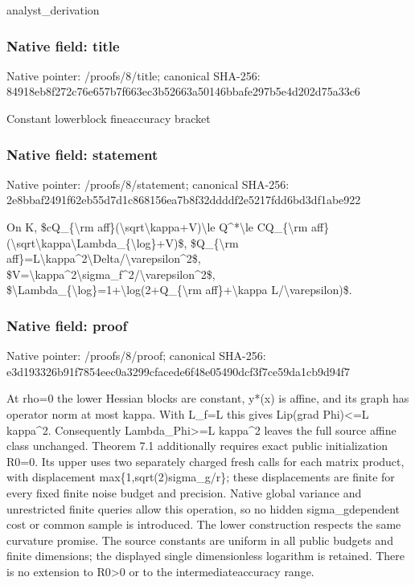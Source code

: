 \documentclass[10pt,a4paper]{article}
\begin{document}
analyst\_derivation


\subsubsection{Native field: title}


Native pointer: /proofs/8/title; canonical SHA-256: 84918eb8f272c76e657b7f66\allowbreak{}3ec3b52663a50146bbafe297\allowbreak{}b5e4d202d75a33c6


Constant lowerblock fineaccuracy bracket


\subsubsection{Native field: statement}


Native pointer: /proofs/8/statement; canonical SHA-256: 2e8bbaf2491f62eb55d7d1c8\allowbreak{}68156ea7b8f32ddddf2e5217\allowbreak{}fdd6bd3df1abe922


On K, \$cQ\_\{\textbackslash{}rm aff\}(\textbackslash{}sqrt\textbackslash{}kappa+V)\textbackslash{}le Q\textasciicircum{}*\textbackslash{}le CQ\_\{\textbackslash{}rm aff\}(\textbackslash{}sqrt\textbackslash{}kappa\textbackslash{}Lambda\_\{\textbackslash{}log\}+V)\$, \$Q\_\{\textbackslash{}rm aff\}=L\textbackslash{}kappa\textasciicircum{}2\textbackslash{}Delta/\textbackslash{}varepsilon\textasciicircum{}2\$, \$V=\textbackslash{}kappa\textasciicircum{}2\textbackslash{}sigma\_f\textasciicircum{}2/\textbackslash{}varepsilon\textasciicircum{}2\$, \$\textbackslash{}Lambda\_\{\textbackslash{}log\}=1+\textbackslash{}log(2+Q\_\{\textbackslash{}rm aff\}+\textbackslash{}kappa L/\textbackslash{}varepsilon)\$.


\subsubsection{Native field: proof}


Native pointer: /proofs/8/proof; canonical SHA-256: e3d193326b91f7854eec0a32\allowbreak{}99cfacede6f48e05490dcf3f\allowbreak{}7ce59da1cb9d94f7


At rho=0 the lower Hessian blocks are constant, y*(x) is affine, and its graph has operator norm at most kappa. With L\_f=L this gives Lip(grad Phi)<=L kappa\textasciicircum{}2. Consequently Lambda\_Phi>=L kappa\textasciicircum{}2 leaves the full source affine class unchanged. Theorem 7.1 additionally requires exact public initialization R0=0. Its upper uses two separately charged fresh calls for each matrix product, with displacement max\{1,sqrt(2)sigma\_g/r\}; these displacements are finite for every fixed finite noise budget and precision. Native global variance and unrestricted finite queries allow this operation, so no hidden sigma\_gdependent cost or common sample is introduced. The lower construction respects the same curvature promise. The source constants are uniform in all public budgets and finite dimensions; the displayed single dimensionless logarithm is retained. There is no extension to R0>0 or to the intermediateaccuracy range.
\end{document}
